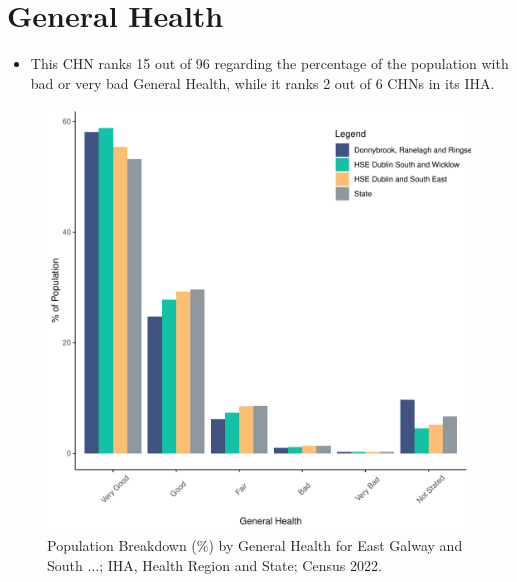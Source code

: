 \documentclass{article}
\begin{document}
\pagebreak

\section{General Health}\label{sect:GenHealth}
\begin{itemize}
\item  This CHN ranks  15 out of 96 regarding the percentage of the population with bad or very bad General Health, while it ranks   2 out of 6 CHNs in its IHA.
\end{itemize}
\begin{figure}[h]
	\centering
	\includegraphics[width = 150mm]{../figures/GenED.pdf}
	\caption{Population Breakdown (\%) by General Health for East Galway and South ...; IHA, Health Region and State;  Census 2022.}
	\label{fig:2ae19629-1a6a-13a3-e055-000000000001}
	\end{figure}
\end{document}
